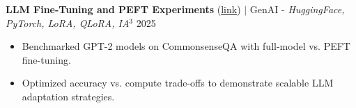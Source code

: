 \documentclass[letterpaper,11pt]{article}
\begin{document}
\small{

{\textbf{LLM Fine-Tuning and PEFT Experiments} (\href{https://github.com/vishugp/Comparative_LLM_FineTuning}{\underline{link}}) $|$ GenAI - \emph{HuggingFace, PyTorch, LoRA, QLoRA, IA$^3$}} \hfill{2025}\vspace{-4pt}
\begin{itemize}[leftmargin=0.18in, itemsep=1px, parsep=0pt]
\item Benchmarked GPT-2 models on CommonsenseQA with full-model vs. PEFT fine-tuning.
\item Optimized accuracy vs. compute trade-offs to demonstrate scalable LLM adaptation strategies.

\end{itemize}\vspace{-0pt}







}
\end{document}
